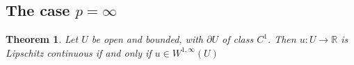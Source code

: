 \documentclass[11pt,a4paper]{report}
\newtheorem{theorem}{Theorem}[section]
\theoremstyle{definition}
\begin{document}
\subsection{The case $p = \infty$}

\begin{theorem}
    Let $U$ be open and bounded, with $\partial U$ of class $C^1$. 
    Then $u: U \rightarrow \mathbb{R}$ is Lipschitz continuous if and only if $u \in W^{1, \infty}(U)$
\end{theorem}
\end{document}
